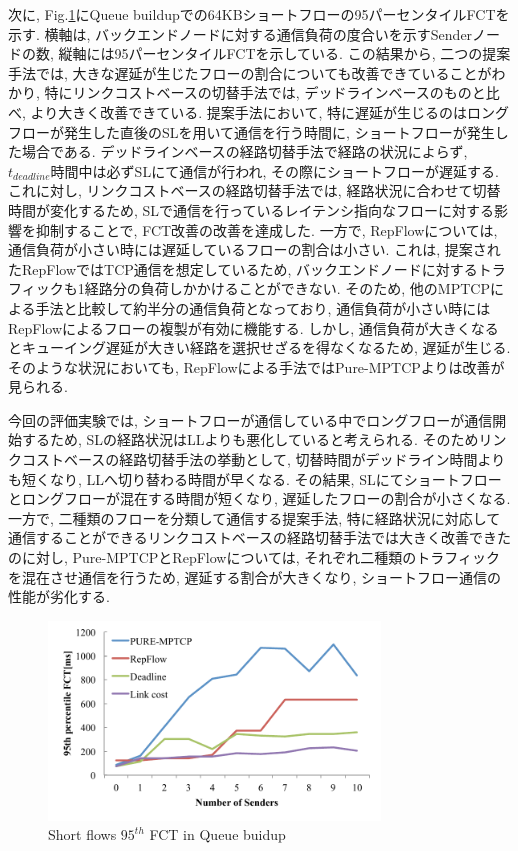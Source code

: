 次に, Fig.\ref{fig:eval2_tail}にQueue buildupでの64KBショートフローの95パーセンタイルFCTを示す. 
横軸は, バックエンドノードに対する通信負荷の度合いを示すSenderノードの数, 縦軸には95パーセンタイルFCTを示している. 
この結果から, 二つの提案手法では, 大きな遅延が生じたフローの割合についても改善できていることがわかり, 特にリンクコストベースの切替手法では,
デッドラインベースのものと比べ, より大きく改善できている. 
提案手法において, 特に遅延が生じるのはロングフローが発生した直後のSLを用いて通信を行う時間に,
ショートフローが発生した場合である.
デッドラインベースの経路切替手法で経路の状況によらず, $t_{deadline}$時間中は必ずSLにて通信が行われ, その際にショートフローが遅延する. 
これに対し, リンクコストベースの経路切替手法では, 経路状況に合わせて切替時間が変化するため,
SLで通信を行っているレイテンシ指向なフローに対する影響を抑制することで, FCT改善の改善を達成した. 
一方で, RepFlowについては, 通信負荷が小さい時には遅延しているフローの割合は小さい. 
これは, 提案されたRepFlowではTCP通信を想定しているため, バックエンドノードに対するトラフィックも1経路分の負荷しかかけることができない. 
そのため, 他のMPTCPによる手法と比較して約半分の通信負荷となっており, 通信負荷が小さい時にはRepFlowによるフローの複製が有効に機能する. 
しかし, 通信負荷が大きくなるとキューイング遅延が大きい経路を選択せざるを得なくなるため, 遅延が生じる. 
そのような状況においても, RepFlowによる手法ではPure-MPTCPよりは改善が見られる. 

今回の評価実験では, ショートフローが通信している中でロングフローが通信開始するため,
SLの経路状況はLLよりも悪化していると考えられる.
そのためリンクコストベースの経路切替手法の挙動として, 切替時間がデッドライン時間よりも短くなり, LLへ切り替わる時間が早くなる. 
その結果, SLにてショートフローとロングフローが混在する時間が短くなり, 遅延したフローの割合が小さくなる. 
一方で, 二種類のフローを分類して通信する提案手法,
特に経路状況に対応して通信することができるリンクコストベースの経路切替手法では大きく改善できたのに対し, Pure-MPTCPとRepFlowについては,
それぞれ二種類のトラフィックを混在させ通信を行うため, 遅延する割合が大きくなり, ショートフロー通信の性能が劣化する. 


\begin{figure}[t]
    \begin{center}
    \includegraphics[autoebb, width=250pt]{./img/eval2_tail.pdf}
    \caption{Short flows $95^{th}$ FCT in Queue buidup}
    \label{fig:eval2_tail}
    \end{center}
\end{figure}


